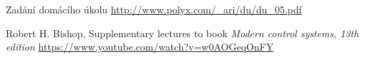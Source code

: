 \documentclass[twoside]{article}
\begin{document}
\begin{thebibliography}{9}

	 Zadání domácího úkolu \url{http://www.polyx.com/_ari/du/du_05.pdf}

	Robert H. Bishop, Supplementary lectures to book \emph{Modern control systems, 13th edition} \url{https://www.youtube.com/watch?v=w0AOGeqOnFY}

\end{thebibliography}
\end{document}
